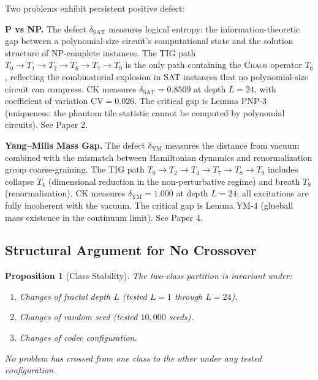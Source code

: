 \documentclass[11pt]{article}
\newtheorem{proposition}[theorem]{Proposition}
\begin{document}
Two problems exhibit persistent positive defect:

\medskip
\noindent
\textbf{P vs NP.}  The defect $\delta_{\mathrm{SAT}}$ measures logical
entropy: the information-theoretic gap between a polynomial-size
circuit's computational state and the solution structure of NP-complete
instances.  The TIG path $T_0 \to T_1 \to T_2 \to T_6 \to T_7 \to T_9$
is the only path containing the \textsc{Chaos} operator $T_6$, reflecting
the combinatorial explosion in SAT instances that no polynomial-size
circuit can compress.  CK measures $\delta_{\mathrm{SAT}} = 0.8509$ at
depth $L = 24$, with coefficient of variation $\mathrm{CV} = 0.026$.
The critical gap is Lemma PNP-3 (uniqueness: the phantom tile statistic
cannot be computed by polynomial circuits).  See Paper 2.

\medskip
\noindent
\textbf{Yang--Mills Mass Gap.}  The defect $\delta_{\mathrm{YM}}$
measures the distance from vacuum combined with the mismatch between
Hamiltonian dynamics and renormalization group coarse-graining.  The
TIG path $T_0 \to T_2 \to T_4 \to T_7 \to T_8 \to T_9$ includes
collapse $T_4$ (dimensional reduction in the non-perturbative regime)
and breath $T_8$ (renormalization).  CK measures
$\delta_{\mathrm{YM}} = 1.000$ at depth $L = 24$: all excitations are
fully incoherent with the vacuum.  The critical gap is Lemma YM-4
(glueball mass existence in the continuum limit).  See Paper 4.

\subsection{Structural Argument for No Crossover}
\label{subsec:no-crossover}

\begin{proposition}[Class Stability]
\label{prop:stability}
The two-class partition is invariant under:
\begin{enumerate}
\item Changes of fractal depth $L$ (tested $L = 1$ through $L = 24$).
\item Changes of random seed (tested $10{,}000$ seeds).
\item Changes of codec configuration.
\end{enumerate}
No problem has crossed from one class to the other under any tested
configuration.
\end{proposition}
\end{document}
